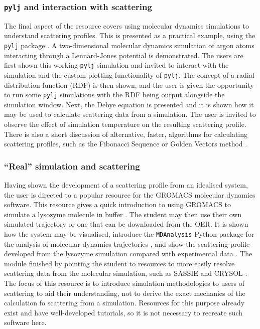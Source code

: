 \subsubsection{\texttt{pylj} and interaction with scattering}
The final aspect of the resource covers using molecular dynamics simulations to understand scattering profiles.
This is presented as a practical example, using the \texttt{pylj} package \cite{mccluskey_pylj_2018,mccluskey_arm61/pylj_2019-2}.
A two-dimensional molecular dynamics simulation of argon atoms interacting through a Lennard-Jones potential is demonstrated.
The users are first shown this working \texttt{pylj} simulation and invited to interact with the simulation and the custom plotting functionality of \texttt{pylj}.
The concept of a radial distribution function (RDF) is then shown, and the user is given the opportunity to run some \texttt{pylj} simulations with the RDF being output alongside the simulation window.
Next, the Debye equation \cite{debye_zerstreuung_1915} is presented and it is shown how it may be used to calculate scattering data from a simulation.
The user is invited to observe the effect of simulation temperature on the resulting scattering profile.
There is also a short discussion of alternative, faster, algorithms for calculating scattering profiles, such as the Fibonacci Sequence or Golden Vectors method \cite{watson_rapid_2013,svergun_solution_1994}.

\subsubsection{``Real'' simulation and scattering}
Having shown the development of a scattering profile from an idealised system, the user is directed to a popular resource for the GROMACS \cite{berendsen_gromacs_1995} molecular dynamics software.
This resource gives a quick introduction to using GROMACS to simulate a lysozyme molecule in buffer \cite{lemkul_gromacs_nodate}.
The student may then use their own simulated trajectory or one that can be downloaded from the OER.
It is shown how the system may be visualised, introduce the \texttt{MDAnalysis} Python package for the analysis of molecular dynamics trajectories \cite{michaud-agrawal_mdanalysis_2011,gowers_mdanalysis_2016}, and show the scattering profile developed from the lysozyme simulation compared with experimental data \cite{franke_correlation_2015}.
The module finished by pointing the student to resources to more easily resolve scattering data from the molecular simulation, such as SASSIE and CRYSOL \cite{perkins_atomistic_2016,svergun_crysol_1995}.
The focus of this resource is to introduce simulation methodologies to users of scattering to aid their understanding, not to derive the exact mechanics of the calculation fo scattering from a simulation.
Resources for this purpose already exist and have well-developed tutorials, so it is not necessary to recreate such software here.
